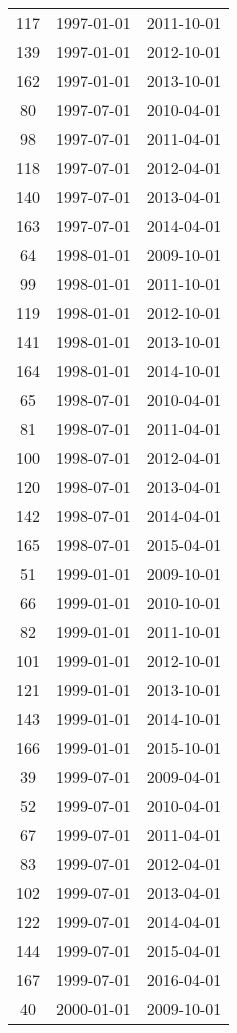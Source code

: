 \begin{tabular}{ccc}
  117 & 1997-01-01 & 2011-10-01 \\ 
  139 & 1997-01-01 & 2012-10-01 \\ 
  162 & 1997-01-01 & 2013-10-01 \\ 
  80 & 1997-07-01 & 2010-04-01 \\ 
  98 & 1997-07-01 & 2011-04-01 \\ 
  118 & 1997-07-01 & 2012-04-01 \\ 
  140 & 1997-07-01 & 2013-04-01 \\ 
  163 & 1997-07-01 & 2014-04-01 \\ 
  64 & 1998-01-01 & 2009-10-01 \\ 
  99 & 1998-01-01 & 2011-10-01 \\ 
  119 & 1998-01-01 & 2012-10-01 \\ 
  141 & 1998-01-01 & 2013-10-01 \\ 
  164 & 1998-01-01 & 2014-10-01 \\ 
  65 & 1998-07-01 & 2010-04-01 \\ 
  81 & 1998-07-01 & 2011-04-01 \\ 
  100 & 1998-07-01 & 2012-04-01 \\ 
  120 & 1998-07-01 & 2013-04-01 \\ 
  142 & 1998-07-01 & 2014-04-01 \\ 
  165 & 1998-07-01 & 2015-04-01 \\ 
  51 & 1999-01-01 & 2009-10-01 \\ 
  66 & 1999-01-01 & 2010-10-01 \\ 
  82 & 1999-01-01 & 2011-10-01 \\ 
  101 & 1999-01-01 & 2012-10-01 \\ 
  121 & 1999-01-01 & 2013-10-01 \\ 
  143 & 1999-01-01 & 2014-10-01 \\ 
  166 & 1999-01-01 & 2015-10-01 \\ 
  39 & 1999-07-01 & 2009-04-01 \\ 
  52 & 1999-07-01 & 2010-04-01 \\ 
  67 & 1999-07-01 & 2011-04-01 \\ 
  83 & 1999-07-01 & 2012-04-01 \\ 
  102 & 1999-07-01 & 2013-04-01 \\ 
  122 & 1999-07-01 & 2014-04-01 \\ 
  144 & 1999-07-01 & 2015-04-01 \\ 
  167 & 1999-07-01 & 2016-04-01 \\ 
  40 & 2000-01-01 & 2009-10-01 \\ 

\end{tabular}
